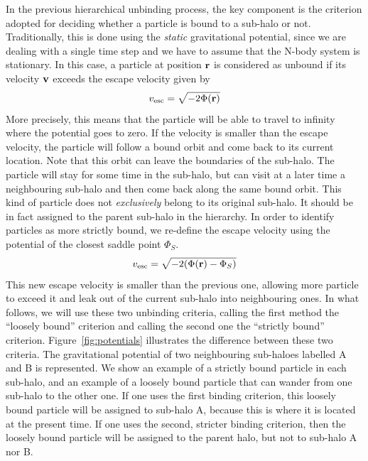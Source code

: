 In the previous hierarchical unbinding process, the key component is
the criterion adopted for deciding whether a particle is bound to a
sub-halo or not.  Traditionally, this is done using the {\it static}
gravitational potential, since we are dealing with a single time step
and we have to assume that the N-body system is stationary.  In this
case, a particle at position ${\bf r}$ is considered as unbound if its
velocity ${\bf v}$ exceeds the escape velocity given by
\begin{equation}
v_{\rm esc} = \sqrt{- 2\Phi(\mathbf{r})} 
\label{eq:boundv}
\end{equation}
More precisely, this means that the particle will be able to travel to
infinity where the potential goes to  zero. If the velocity is smaller
than the escape  velocity, the particle will follow a  bound orbit and
come back to its current location.  Note that this orbit can leave the
boundaries of the  sub-halo.  The particle will stay for  some time in
the sub-halo,  but can visit at  a later time a  neighbouring sub-halo
and then come back along the  same bound orbit.  This kind of particle
does not {\it exclusively} belong  to its original sub-halo. It should
be in fact assigned to the parent sub-halo in the hierarchy.  In order
to identify particles as more  strictly bound, we re-define the escape
velocity using the potential of the closest saddle point $\Phi_S$.
\begin{equation}
v_{\rm esc} = \sqrt{- 2(\Phi(\mathbf{r})-\Phi_S)} 
\label{eq:boundv_corr}
\end{equation}
This new  escape velocity is  smaller than the previous  one, allowing
more particle to  exceed it and leak out of  the current sub-halo into
neighbouring ones.  In what  follows, we will  use these two unbinding
criteria, calling the first method the ``loosely bound'' criterion and
calling   the   second   one   the   ``strictly   bound''   criterion.
Figure~\ref{fig:potentials} illustrates  the difference  between these
two  criteria.   The  gravitational  potential  of   two  neighbouring
sub-haloes labelled A  and B is represented.  We show  an example of a
strictly bound particle in each sub-halo,  and an example of a loosely
bound particle that can wander from one sub-halo to the other one.  If
one uses the first binding criterion, this loosely bound particle
will be  assigned to sub-halo A,  because this is where  it is located at
the present time.  If one uses the second, stricter binding criterion,
then the loosely bound particle will be assigned to the parent halo, but
not to sub-halo A nor B.



